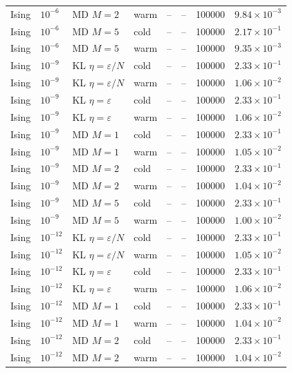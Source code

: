 \begin{table}[t]
\begin{tabular}{llllrrrr}
Ising & $10^{-6}$ & MD $M=2$ & warm & -- & -- & 100000 & $9.84\times 10^{-3}$ \\
Ising & $10^{-6}$ & MD $M=5$ & cold & -- & -- & 100000 & $2.17\times 10^{-1}$ \\
Ising & $10^{-6}$ & MD $M=5$ & warm & -- & -- & 100000 & $9.35\times 10^{-3}$ \\
\midrule
Ising & $10^{-9}$ & KL $\eta=\varepsilon/N$ & cold & -- & -- & 100000 & $2.33\times 10^{-1}$ \\
Ising & $10^{-9}$ & KL $\eta=\varepsilon/N$ & warm & -- & -- & 100000 & $1.06\times 10^{-2}$ \\
Ising & $10^{-9}$ & KL $\eta=\varepsilon$ & cold & -- & -- & 100000 & $2.33\times 10^{-1}$ \\
Ising & $10^{-9}$ & KL $\eta=\varepsilon$ & warm & -- & -- & 100000 & $1.06\times 10^{-2}$ \\
Ising & $10^{-9}$ & MD $M=1$ & cold & -- & -- & 100000 & $2.33\times 10^{-1}$ \\
Ising & $10^{-9}$ & MD $M=1$ & warm & -- & -- & 100000 & $1.05\times 10^{-2}$ \\
Ising & $10^{-9}$ & MD $M=2$ & cold & -- & -- & 100000 & $2.33\times 10^{-1}$ \\
Ising & $10^{-9}$ & MD $M=2$ & warm & -- & -- & 100000 & $1.04\times 10^{-2}$ \\
Ising & $10^{-9}$ & MD $M=5$ & cold & -- & -- & 100000 & $2.33\times 10^{-1}$ \\
Ising & $10^{-9}$ & MD $M=5$ & warm & -- & -- & 100000 & $1.00\times 10^{-2}$ \\
\midrule
Ising & $10^{-12}$ & KL $\eta=\varepsilon/N$ & cold & -- & -- & 100000 & $2.33\times 10^{-1}$ \\
Ising & $10^{-12}$ & KL $\eta=\varepsilon/N$ & warm & -- & -- & 100000 & $1.05\times 10^{-2}$ \\
Ising & $10^{-12}$ & KL $\eta=\varepsilon$ & cold & -- & -- & 100000 & $2.33\times 10^{-1}$ \\
Ising & $10^{-12}$ & KL $\eta=\varepsilon$ & warm & -- & -- & 100000 & $1.06\times 10^{-2}$ \\
Ising & $10^{-12}$ & MD $M=1$ & cold & -- & -- & 100000 & $2.33\times 10^{-1}$ \\
Ising & $10^{-12}$ & MD $M=1$ & warm & -- & -- & 100000 & $1.04\times 10^{-2}$ \\
Ising & $10^{-12}$ & MD $M=2$ & cold & -- & -- & 100000 & $2.33\times 10^{-1}$ \\
Ising & $10^{-12}$ & MD $M=2$ & warm & -- & -- & 100000 & $1.04\times 10^{-2}$ \\

\end{tabular}
\end{table}
